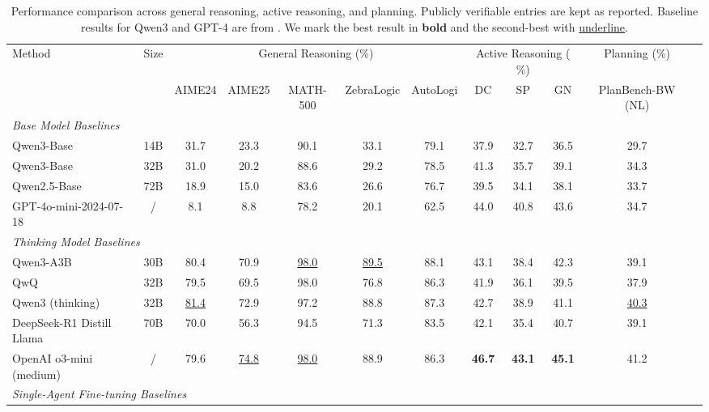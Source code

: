 \documentclass[sigconf]{aamas}
\begin{document}
\begin{table}[htbp]
\centering
\captionsetup{font=small} 
  \caption{Performance comparison across general reasoning, active reasoning, and planning. Publicly verifiable entries are kept as reported. Baseline results for Qwen3 and GPT-4 are from \citep{yang2025qwen3technicalreport}. We mark the best result in \textbf{bold} and the second-best with \underline{underline}.}
\label{tab:overall}
\small
\begin{tabular}{lccccccccccc}
\toprule
\multirow{2}{*}{Method} & \multirow{2}{*}{Size} & \multicolumn{5}{c}{General Reasoning (\%)} & \multicolumn{3}{c}{Active Reasoning ( \%)} & \multicolumn{1}{c}{Planning (\%)} \\
\cmidrule(lr){3-7}\cmidrule(lr){8-10}\cmidrule(lr){11-11}
& & AIME24 & AIME25 & MATH-500 & ZebraLogic & AutoLogi & DC & SP & GN & PlanBench-BW (NL) \\
\midrule
\multicolumn{11}{l}{\textit{Base Model Baselines}} \\
Qwen3-Base & 14B & 31.7 & 23.3 & 90.1 & 33.1 & 79.1 & 37.9 & 32.7 & 36.5 & 29.7 \\
Qwen3-Base & 32B & 31.0 & 20.2 & 88.6 & 29.2 & 78.5 & 41.3 & 35.7 & 39.1 & 34.3 \\
Qwen2.5-Base & 72B & 18.9 & 15.0 & 83.6 & 26.6 & 76.7 & 39.5 & 34.1 & 38.1 & 33.7 \\
GPT-4o-mini-2024-07-18 & / & 8.1 & 8.8 & 78.2 & 20.1 & 62.5 & 44.0 & 40.8 & 43.6 & 34.7 \\
\midrule
\multicolumn{11}{l}{\textit{Thinking Model Baselines}} \\
Qwen3-A3B & 30B & 80.4 & 70.9 & \underline{98.0} & \underline{89.5} & 88.1 & 43.1 & 38.4 & 42.3 & 39.1 \\
QwQ & 32B & 79.5 & 69.5 & 98.0 & 76.8 & 86.3 & 41.9 & 36.1 & 39.5 & 37.9 \\
Qwen3 (thinking) & 32B & \underline{81.4} & 72.9 & 97.2 & 88.8 & 87.3 & 42.7 & 38.9 & 41.1 & \underline{40.3} \\
DeepSeek-R1 Distill Llama & 70B & 70.0 & 56.3 & 94.5 & 71.3 & 83.5 & 42.1 & 35.4 & 40.7 & 39.1 \\
OpenAI o3-mini (medium) & / & 79.6 & \underline{74.8} & \underline{98.0} & 88.9 & 86.3 & \textbf{46.7} & \textbf{43.1} & \textbf{45.1} & 41.2 \\
\midrule
\multicolumn{11}{l}{\textit{Single-Agent Fine-tuning Baselines}} \\

\end{tabular}
\end{table}
\end{document}
